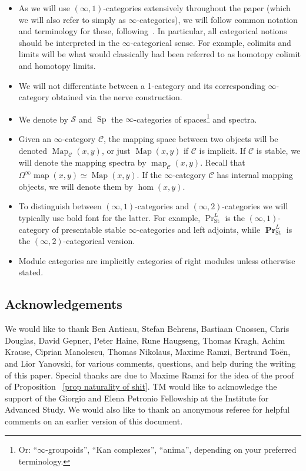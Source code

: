 \documentclass[10pt]{amsart}
\theoremstyle{plain}
\theoremstyle{definition}
\DeclareMathOperator{\Sp}{Sp}
\DeclareMathOperator{\PPr}{\mathbf{Pr}}
\DeclareMathOperator{\Map}{Map}
\DeclareMathOperator{\map}{map}
\newcommand{\St}{\mathrm{St}}
\newcommand{\cC}{\mathcal{C}}
\newcommand{\cS}{\mathcal{S}}
\begin{document}
\begin{itemize}
  \item As we will use $(\infty,1)$-categories extensively throughout the paper (which we will also refer to simply as $\infty$-categories), we will follow common notation and terminology for these, following~\cite{HTT, HA}.  In particular, all categorical notions should be interpreted in the $\infty$-categorical sense. For example, colimits and limits will be what would classically had been referred to as homotopy colimit and homotopy limits.
  \item We will not differentiate between a 1-category and its corresponding $\infty$-category obtained via the nerve construction.
  \item We denote by $\cS$ and $\Sp$ the $\infty$-categories of spaces\footnote{Or: ``$\infty$-groupoids'', ``Kan complexes'', ``anima'', depending on your preferred terminology.} and spectra.
  \item  Given an $\infty$-category $\cC$, the mapping space between two objects will be denoted $\Map_{\cC}(x,y)$, or just $\Map(x,y)$ if $\cC$ is implicit. If $\cC$ is stable, we will denote the mapping spectra by $\map_{\cC}(x,y)$. Recall that $\Omega^\infty\map(x,y) \simeq \Map(x,y)$. If the $\infty$-category $\cC$ has internal mapping objects, we will denote them by $\hom(x,y)$.
  \item To distinguish between $(\infty,1)$-categories and $(\infty,2)$-categories we will typically use bold font for the latter.
  For example, $\Pr^{L}_{\St}$ is the $(\infty,1)$-category of presentable stable $\infty$-categories and left adjoints, while $\PPr_{\St}^L$ is the $(\infty,2)$-categorical version.
  \item Module categories are implicitly categories of right modules unless otherwise stated.

\end{itemize}

\subsection*{Acknowledgements}

We would like to thank Ben Antieau, Stefan Behrens, Bastiaan Cnossen, Chris Douglas, David Gepner, Peter Haine, Rune Haugseng, Thomas Kragh, Achim Krause, Ciprian Manolescu, Thomas Nikolaus, Maxime Ramzi, Bertrand Toën, and Lior Yanovski, for various comments, questions, and help during the writing of this paper. Special thanks are due to Maxime Ramzi for the idea of the proof of Proposition ~\ref{prop naturality of shit}. TM would like to acknowledge the support of the Giorgio and Elena Petronio Fellowship at the Institute for Advanced Study.
We would also like to thank an anonymous referee for helpful comments on an earlier version of this document.
\end{document}
